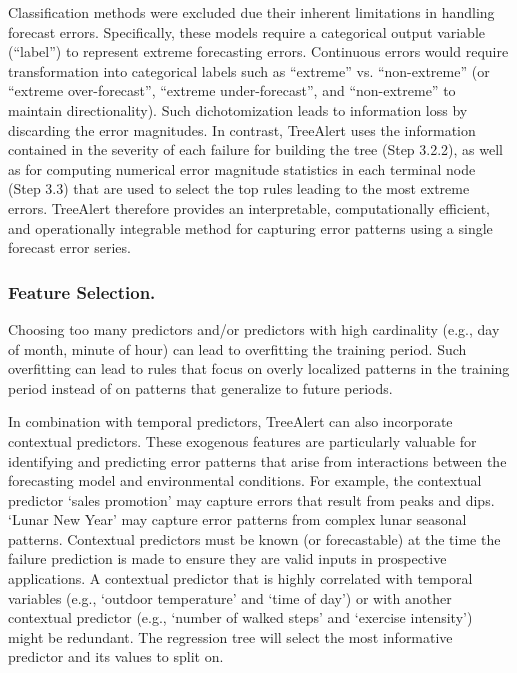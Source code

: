 \documentclass[preprint,12pt]{elsarticle}
\begin{document}
Classification methods were excluded due their inherent limitations in handling forecast errors. Specifically, these models require a categorical output variable (“label”) to represent extreme forecasting errors. Continuous errors would require transformation into categorical labels such as “extreme” vs. “non-extreme” (or “extreme over-forecast”, “extreme under-forecast”, and “non-extreme” to maintain directionality). Such dichotomization leads to information loss by discarding the error magnitudes. In contrast, TreeAlert uses the information contained in the severity of each failure for building the tree (Step 3.2.2), as well as for computing numerical error magnitude statistics in each terminal node (Step 3.3) that are used to select the top rules leading to the most extreme errors. TreeAlert therefore provides an interpretable, computationally efficient, and operationally integrable method for capturing error patterns using a single forecast error series.

\subsubsection{Feature Selection.}
Choosing too many predictors and/or predictors with high cardinality (e.g., day of month, minute of hour) can lead to overfitting the training period. Such overfitting can lead to rules that focus on overly localized patterns in the training period instead of on patterns that generalize to future periods. 

In combination with temporal predictors, TreeAlert can also incorporate contextual predictors. These exogenous features are particularly valuable for identifying and predicting error patterns that arise from interactions between the forecasting model and environmental conditions. For example, the contextual predictor ‘sales promotion’ may capture errors that result from peaks and dips. `Lunar New Year' may capture error patterns from complex lunar seasonal patterns. Contextual predictors must be known (or forecastable) at the time the failure prediction is made to ensure they are valid inputs in prospective applications. A contextual predictor that is highly correlated with temporal variables (e.g., `outdoor temperature' and `time of day') or with another contextual predictor (e.g., `number of walked steps' and `exercise intensity') might be redundant. The regression tree will select the most informative predictor and its values to split on.
\end{document}
